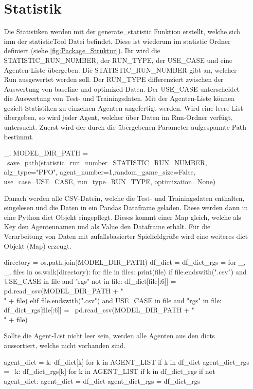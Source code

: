 \section{Statistik}
Die Statistiken werden mit der generate\_statistic Funktion erstellt, welche sich imn der statisticTool Datei befindet. Diese ist wiederum im statistic Ordner definiert (siehe \ref{fig:Package_Struktur}). Ihr wird die STATISTIC\_RUN\_NUMBER, der RUN\_TYPE, der USE\_CASE und eine Agenten-Liste übergeben. Die STATISTIC\_RUN\_NUMBER gibt an, welcher Run ausgewertet werden soll. Der RUN\_TYPE differenziert zwischen der Auswertung von baseline und optimized Daten. Der USE\_CASE unterscheidet die Auswertung von Test- und Trainingsdaten. Mit der Agenten-Liste können gezielt Statistiken zu einzelnen Agenten angefertigt werden. Wird eine leere List übergeben, so wird jeder Agent, welcher über Daten im Run-Ordner verfügt, untersucht.
Zuerst wird der durch die übergebenen Parameter aufgespannte Path bestimmt.
\begin{python}
	_, MODEL_DIR_PATH = \
	save_path(statistic_run_number=STATISTIC_RUN_NUMBER, alg_type="PPO",
	 					agent_number=1,random_game_size=False, 
			    	use_case=USE_CASE, run_type=RUN_TYPE, 
			    	optimization=None)
\end{python}
Danach werden alle CSV-Datein, welche die Test- und Trainingsdaten enthalten, eingelesen und die Daten in ein Pandas Dataframe geladen. Diese werden dann in eine Python dict Objekt eingepflegt. Dieses kommt einer Map gleich, welche als Key den Agentennamen und als Value den Dataframe erhält. Für die Verarbeitung von Daten mit zufallsbasierter Spielfeldgröße wird eine weiteres dict Objekt (Map) erzeugt.
\begin{python}
	directory = os.path.join(MODEL_DIR_PATH)
	df_dict = {}
	df_dict_rgs = {}
	for _, _, files in os.walk(directory):
		for file in files:
			print(file)
			if file.endswith(".csv") and USE_CASE in file 
				 and "rgs" not in file:
				df_dict[file[:6]] = pd.read_csv(MODEL_DIR_PATH + "\\" + file)
			elif file.endswith(".csv") and USE_CASE in file 
				   and "rgs" in file:
				df_dict_rgs[file[:6]] = \
				pd.read_csv(MODEL_DIR_PATH + "\\" + file)
\end{python}
Sollte die Agent-List nicht leer sein, werden alle Agenten aus den dicts aussortiert, welche nicht vorhanden sind.
\begin{python}
	agent_dict = {k: df_dict[k] for k in AGENT_LIST if k in df_dict}
	agent_dict_rgs = \
	{k: df_dict_rgs[k] for k in AGENT_LIST if k in df_dict_rgs}
	if not agent_dict:
		agent_dict = df_dict
		agent_dict_rgs = df_dict_rgs
\end{python}
